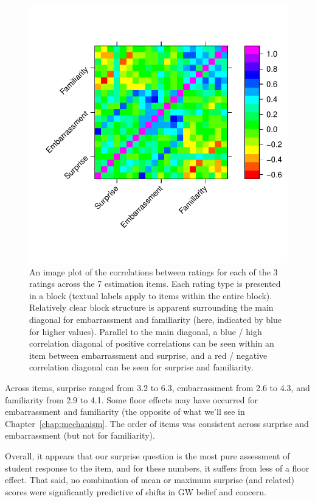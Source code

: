 \begin{figure}
    \centering
    \includegraphics{CCO-prondi-surp-corr.pdf}
    \caption{An image plot of the correlations between ratings for each of the 3
        ratings across the 7 estimation items. Each rating type is presented in
        a block (textual labels apply to items within the entire block).
        Relatively clear block structure is apparent surrounding the main
        diagonal for embarrassment and familiarity (here, indicated by blue for
        higher values). Parallel to the main diagonal, a blue / high correlation
        diagonal of positive correlations can be seen within an item between
        embarrassment and surprise, and a red / negative correlation diagonal
        can be seen for surprise and familiarity.}
    \label{fig:CCO-prondi-surp-corr}
\end{figure}

Across items, surprise ranged from 3.2 to 6.3, embarrassment from 2.6 to 4.3,
and familiarity from 2.9 to 4.1. Some floor effects may have occurred for
embarrassment and familiarity (the opposite of what we'll see in
Chapter~\ref{chap:mechanism}. The order of items was consistent across
surprise and embarrassment (but not for familiarity). 

Overall, it appears that our surprise question is the most pure assessment of
student response to the item, and for these numbers, it suffers from less of a
floor effect. That said, no combination of mean or maximum surprise (and
related) scores were significantly predictive of shifts in GW belief and
concern.

